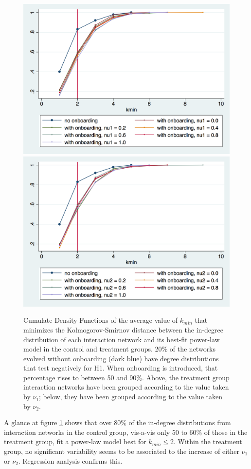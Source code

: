 \documentclass{article}
\begin{document}

\begin{figure}[thb]
\centering

	\includegraphics[width=.75\linewidth]{./Pictures/CDF_kmin_nu1.png}
	\includegraphics[width=.75\linewidth]{./Pictures/CDF_kmin_nu2.png}
  \caption{Cumulate Density Functions of the average value of $k_{min}$ that minimizes the Kolmogorov-Smirnov distance between the in-degree distribution of each interaction network and its best-fit power-law model in the control and treatment groups. 20\% of the networks evolved without onboarding (dark blue) have degree distributions that test negatively for H1. When onboarding is introduced, that percentage rises to between 50 and 90\%. Above, the treatment group interaction networks have been grouped according to the value taken by $\nu_1$; below, they have been grouped according to the value taken by $\nu_2$.} 
 \label{fig:CDFkmin_nu_1nu_2}
\end{figure}

A glance at figure \ref{fig:CDFkmin_nu_1nu_2} shows that over 80\% of the in-degree distributions from interaction networks in the control group, vis-a-vis only 50 to 60\% of those in the treatment group, fit a power-law model best for $k_{min} \leq 2$. Within the treatment group, no significant variability seems to be associated to the increase of either $\nu_1$ or $\nu_2$. Regression analysis confirms this.
\end{document}
